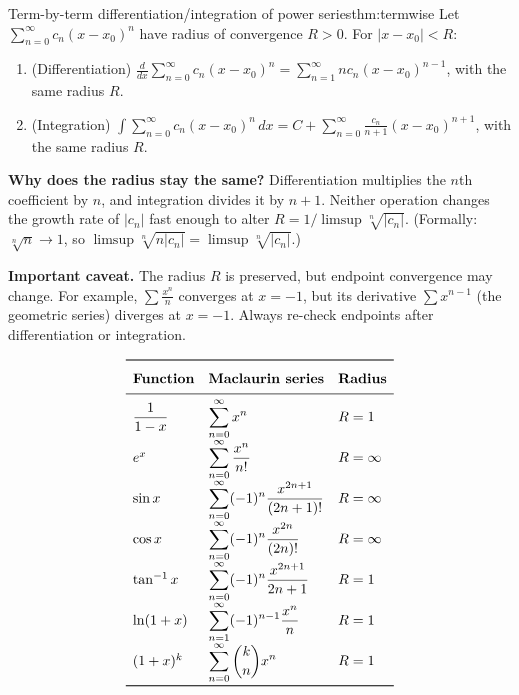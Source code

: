 \begin{theorem}{Term-by-term differentiation/integration of power series}{thm:termwise}
Let $\sum_{n=0}^{\infty} c_n (x-x_0)^n$ have radius of convergence $R>0$.
For $|x-x_0|<R$:
\begin{enumerate}[leftmargin=*]
\item (Differentiation) $\displaystyle\frac{d}{dx}\sum_{n=0}^{\infty}c_n(x-x_0)^n=\sum_{n=1}^{\infty}nc_n(x-x_0)^{n-1}$, with the same radius $R$.
\item (Integration) $\displaystyle\int\sum_{n=0}^{\infty}c_n(x-x_0)^n\,dx=C+\sum_{n=0}^{\infty}\frac{c_n}{n+1}(x-x_0)^{n+1}$, with the same radius $R$.
\end{enumerate}
\end{theorem}

\noindent\textbf{Why does the radius stay the same?}
Differentiation multiplies the $n$th coefficient by $n$, and integration divides it by $n+1$.
Neither operation changes the growth rate of $|c_n|$ fast enough to alter $R=1/\limsup\sqrt[n]{|c_n|}$.
(Formally: $\sqrt[n]{n}\to 1$, so $\limsup\sqrt[n]{n|c_n|}=\limsup\sqrt[n]{|c_n|}$.)

\noindent\textbf{Important caveat.}
The radius $R$ is preserved, but endpoint convergence may change.
For example, $\sum \frac{x^n}{n}$ converges at $x=-1$, but its derivative $\sum x^{n-1}$ (the geometric series) diverges at $x=-1$.
Always re-check endpoints after differentiation or integration.

\begin{keyformula}[title={Key Formula: Important Maclaurin series (memorise for exams)}]
\[
\renewcommand{\arraystretch}{1.6}
\begin{array}{lll}
\toprule
\textbf{Function} & \textbf{Maclaurin series} & \textbf{Radius}\\
\midrule
\dfrac{1}{1-x} & \displaystyle\sum_{n=0}^{\infty}x^n & R=1\\[4pt]
e^x & \displaystyle\sum_{n=0}^{\infty}\dfrac{x^n}{n!} & R=\infty\\[4pt]
\sin x & \displaystyle\sum_{n=0}^{\infty}(-1)^n\dfrac{x^{2n+1}}{(2n+1)!} & R=\infty\\[4pt]
\cos x & \displaystyle\sum_{n=0}^{\infty}(-1)^n\dfrac{x^{2n}}{(2n)!} & R=\infty\\[4pt]
\tan^{-1}x & \displaystyle\sum_{n=0}^{\infty}(-1)^n\dfrac{x^{2n+1}}{2n+1} & R=1\\[4pt]
\ln(1+x) & \displaystyle\sum_{n=1}^{\infty}(-1)^{n-1}\dfrac{x^n}{n} & R=1\\[4pt]
(1+x)^k & \displaystyle\sum_{n=0}^{\infty}\binom{k}{n}x^n & R=1\\
\bottomrule
\end{array}
\]
\end{keyformula}

